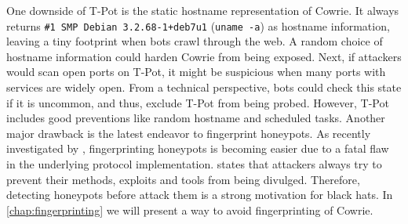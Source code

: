 One downside of T-Pot is the static hostname representation of Cowrie.
It always returns \verb|#1 SMP Debian 3.2.68-1+deb7u1| (\verb|uname -a|) as hostname information, leaving a tiny footprint when bots crawl through the web.
A random choice of hostname information could harden Cowrie from being exposed.
Next, if attackers would scan open ports on T-Pot, it might be suspicious when many ports with services are widely open.
From a technical perspective, bots could check this state if it is uncommon, and thus, exclude T-Pot from being probed.
However, T-Pot includes good preventions like random hostname and scheduled tasks.
Another major drawback is the latest endeavor to fingerprint honeypots.
As recently investigated by \citet{vetterl2020}, fingerprinting honeypots is becoming easier due to a fatal flaw in the underlying protocol implementation.
\citet{vetterl2020} states that attackers always try to prevent their methods, exploits and tools from being divulged.
Therefore, detecting honeypots before attack them is a strong motivation for black hats.
In \autoref{chap:fingerprinting} we will present a way to avoid fingerprinting of Cowrie.
